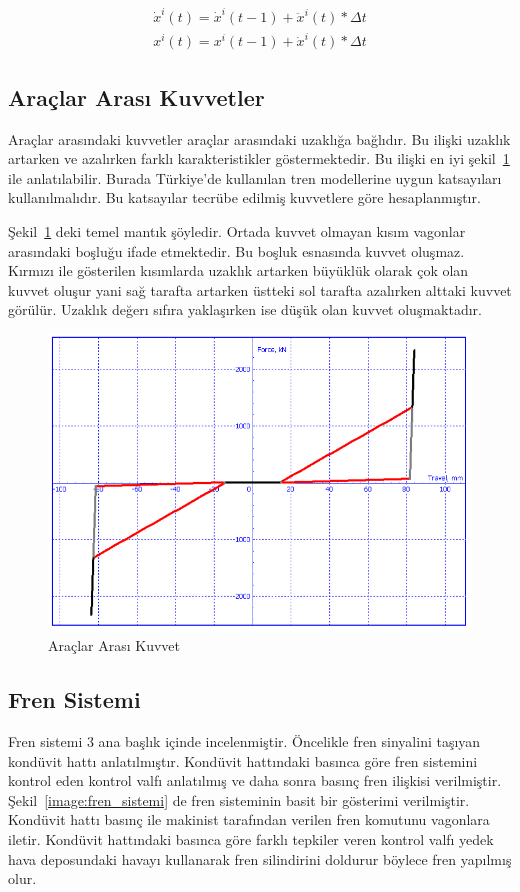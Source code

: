 \documentclass[10pt,a4paper]{article}
\begin{document}
\begin{eqnarray}
\dot{x}^i(t)=\dot{x}^i(t-1)+\ddot{x}^i(t)*\Delta t \\
x^i(t)=x^i(t-1)+\dot{x}^i(t)*\Delta t
\end{eqnarray}


\subsection{Araçlar Arası Kuvvetler}
Araçlar arasındaki kuvvetler araçlar arasındaki uzaklığa bağlıdır. Bu ilişki uzaklık artarken ve azalırken farklı karakteristikler göstermektedir. Bu ilişki en iyi şekil~\ref{image:kanca_kuvvetleri} ile anlatılabilir. Burada Türkiye’de kullanılan tren modellerine uygun katsayıları kullanılmalıdır. Bu katsayılar tecrübe edilmiş kuvvetlere göre hesaplanmıştır.

Şekil~\ref{image:kanca_kuvvetleri} deki temel mantık şöyledir. Ortada kuvvet olmayan kısım vagonlar arasındaki boşluğu ifade etmektedir. Bu boşluk esnasında kuvvet oluşmaz. Kırmızı ile gösterilen kısımlarda uzaklık artarken büyüklük olarak çok olan kuvvet oluşur yani sağ tarafta artarken üstteki sol tarafta azalırken alttaki kuvvet görülür. Uzaklık değerı sıfıra yaklaşırken ise düşük olan kuvvet oluşmaktadır. 

\begin{figure}[h]
\shorthandoff{=}
\centering
\caption{Araçlar Arası Kuvvet}
\label{image:kanca_kuvvetleri}
\includegraphics[scale=0.7]{resimler/kanca_kuvvetleri.png} 
\end{figure}

\newpage


\subsection{Fren Sistemi}
Fren sistemi 3 ana başlık içinde incelenmiştir. Öncelikle fren sinyalini taşıyan kondüvit hattı anlatılmıştır. Kondüvit hattındaki basınca göre fren sistemini kontrol eden kontrol valfı anlatılmış ve daha sonra basınç fren ilişkisi verilmiştir. Şekil~\ref{image:fren_sistemi} de fren sisteminin basit bir gösterimi verilmiştir. Kondüvit hattı basınç ile makinist tarafından verilen fren komutunu vagonlara iletir. Kondüvit hattındaki basınca göre farklı tepkiler veren kontrol valfı yedek hava deposundaki havayı kullanarak fren silindirini doldurur böylece fren yapılmış olur. 
\end{document}
